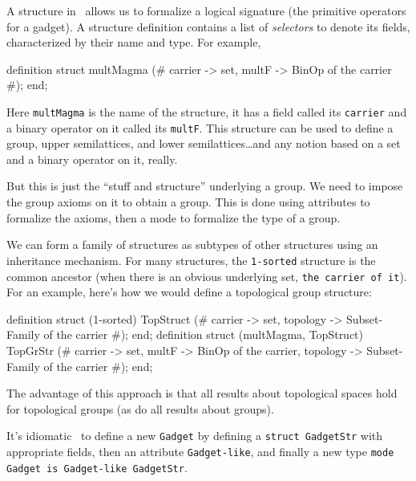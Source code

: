 \begin{node}[Structures]\label{mizar-0012}%
A structure in \Mizar\ allows us to formalize a logical signature (the
primitive operators for a gadget). A structure definition contains a
list of \emph{selectors} to denote its fields, characterized by their
name and type. For example,
\begin{mizar}
definition
  struct multMagma
  (# carrier -> set,
     multF -> BinOp of the carrier #);
end;
\end{mizar}
Here \texttt{multMagma} is the name of the structure, it has a field
called its \texttt{carrier} and a binary operator on it called its
\texttt{multF}. This structure can be used to define a group, upper
semilattices, and lower semilattices\dots and any notion based on a set
and a binary operator on it, really.

But this is just the ``stuff and structure'' underlying a group. We need
to impose the group axioms on it to obtain a group. This is done using
attributes to formalize the axioms, then a mode to formalize the type of
a group.

\begin{node}[Inheritance]\label{mizar-0014}%
We can form a family of structures as subtypes of other structures using
an inheritance mechanism. For many structures, the \texttt{1-sorted}
structure is the common ancestor (when there is an obvious underlying
set, \texttt{the carrier of it}). For an example, here's how we would
define a topological group structure:
\begin{mizar}
definition
  struct (1-sorted) TopStruct
  (# carrier -> set,
     topology -> Subset-Family of the carrier #);
end;
definition
  struct (multMagma, TopStruct) TopGrStr
  (# carrier -> set,
     multF -> BinOp of the carrier,
     topology -> Subset-Family of the carrier #);
end;
\end{mizar}
The advantage of this approach is that all results about topological
spaces hold for topological groups (as do all results about groups).
\end{node}

\begin{node}[Idiom]\label{mizar-0013}%
It's idiomatic \Mizar\ to define a new \texttt{Gadget} by defining a
\texttt{struct GadgetStr} with appropriate fields, then an attribute
\texttt{Gadget-like}, and finally a new type \texttt{mode Gadget is Gadget-like GadgetStr}.
\end{node}


\end{node}
